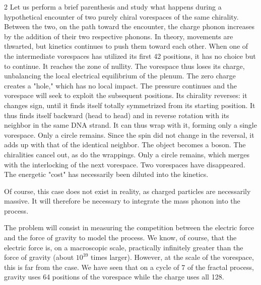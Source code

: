 \begin{multicols}{2}
	Let us perform a brief parenthesis and study what happens during a hypothetical encounter of two purely chiral vorespaces of the same chirality. Between the two, on the path toward the encounter, the charge phonon increases by the addition of their two respective phonons. In theory, movements are thwarted, but kinetics continues to push them toward each other. When one of the intermediate vorespaces has utilized its first 42 positions, it has no choice but to continue. It reaches the zone of nullity. The vorespace thus loses its charge, unbalancing the local electrical equilibrium of the plenum. The zero charge creates a "hole," which has no local impact. The pressure continues and the vorespace will seek to exploit the subsequent positions. Its chirality reverses: it changes sign, until it finds itself totally symmetrized from its starting position. It thus finds itself backward (head to head) and in reverse rotation with its neighbor in the same DNA strand. It can thus wrap with it, forming only a single vorespace. Only a circle remains. Since the spin did not change in the reversal, it adds up with that of the identical neighbor. The object becomes a boson. The chiralities cancel out, as do the wrappings. Only a circle remains, which merges with the interlocking of the next vorespace. Two vorespaces have disappeared. The energetic "cost" has necessarily been diluted into the kinetics.
	
	Of course, this case does not exist in reality, as charged particles are necessarily massive. It will therefore be necessary to integrate the mass phonon into the process.
	
	The problem will consist in measuring the competition between the electric force and the force of gravity to model the process. We know, of course, that the electric force is, on a macroscopic scale, practically infinitely greater than the force of gravity (about $10^{39}$ times larger). However, at the scale of the vorespace, this is far from the case. We have seen that on a cycle of 7 of the fractal process, gravity uses 64 positions of the vorespace while the charge uses all 128.
	\vfill\strut
	

\end{multicols}
